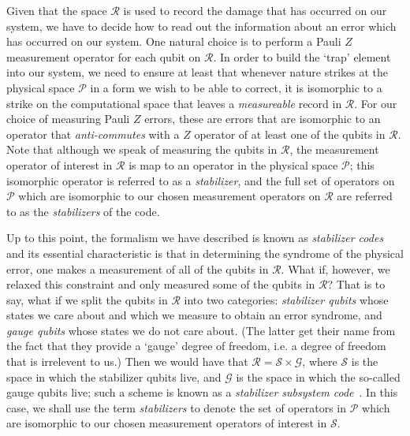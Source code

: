 \documentclass[twocolumn,showpacs,preprintnumbers,amsmath,amssymb,nofootinbib,pra,floatfix]{revtex4-1}
\begin{document}
Given that the space $\mathscr{R}$ is used to record the damage that has occurred on our system, we have to decide how to read out the information about an error which has occurred on our system.  One natural choice is to perform a Pauli $Z$ measurement operator for each qubit on $\mathscr{R}$.  In order to build the `trap' element into our system, we need to ensure at least that whenever nature strikes at the physical space $\mathscr{P}$ in a form we wish to be able to correct, it is isomorphic to a strike on the computational space that leaves a \emph{measureable} record in $\mathscr{R}$.  For our choice of measuring Pauli $Z$ errors, these are errors that are isomorphic to an operator that \emph{anti-commutes} with a $Z$ operator of at least one of the qubits in $\mathscr{R}$.  Note that although we speak of measuring the qubits in $\mathscr{R}$, the measurement operator of interest in $\mathscr{R}$ is map to an operator in the physical space $\mathscr{P}$; this isomorphic operator is referred to as a \emph{stabilizer}, and the full set of operators on $\mathscr{P}$ which are isomorphic to our chosen measurement operators on $\mathscr{R}$ are referred to as the \emph{stabilizers} of the code.

Up to this point, the formalism we have described is known as \emph{stabilizer codes}~\cite{Gottesman:96a,Gottesman:97a,Calderbank:97a,Calderbank:97b} and its essential characteristic is that in determining the syndrome of the physical error, one makes a measurement of all of the qubits in $\mathscr{R}$. What if, however, we relaxed this constraint and only measured some of the qubits in $\mathscr{R}$?  That is to say, what if we split the qubits in $\mathscr{R}$ into two categories: \emph{stabilizer
qubits} whose states we care about and which we measure to obtain an error syndrome, and \emph{gauge
qubits} whose states we do not care about.  (The latter get their name
from the fact that they provide a `gauge' degree of freedom, i.e. a
degree of freedom that is irrelevent to us.)  Then we would have that
$\mathscr{R}=\mathscr{S}\times \mathscr{G}$, where $\mathscr{S}$ is
the space in which the stabilizer qubits live, and $\mathscr{G}$ is
the space in which the so-called gauge qubits live; such a scheme is
known as a \emph{stabilizer subsystem code}~\cite{Poulin:05a}.  In this case, we shall use the term
\emph{stabilizers} to denote the set of operators in $\mathscr{P}$ which are isomorphic to our chosen measurement operators of interest in $\mathscr{S}$.
\end{document}
